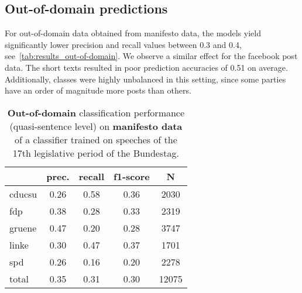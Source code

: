 \documentclass[11pt]{article}
\begin{document}
\subsection{Out-of-domain predictions}
For out-of-domain data obtained from manifesto data, the models yield significantly lower precision and recall values between 0.3 and 0.4, see~\autoref{tab:results_out-of-domain}. We observe a similar effect for the facebook post data. The short texts resulted in poor prediction accuracies of 0.51 on average. Additionally, classes were highly unbalanced in this setting, since some parties have an order of magnitude more posts than others.


\begin{table}[t]
\caption{
\label{tab:results_out-of-domain}
{\bf Out-of-domain} classification performance (quasi-sentence level) on {\bf manifesto data} of a classifier trained on speeches of the 17th legislative period of the Bundestag.
}

\begin{center}
\begin{tabular}{lcccc}
    &         prec.    &recall &  f1-score  & N  \\
\hline \hline
    cducsu    &   0.26   &   0.58   &   0.36    &   2030 \\
    fdp    &   0.38   &   0.28   &   0.33    &   2319 \\
     gruene   &    0.47    &  0.20   &   0.28    &  3747\\
      linke     &  0.30  &    0.47    &  0.37    &   1701\\
        spd     &  0.26  &    0.16   &   0.20    &   2278\\
\hline
total    &   0.35  &    0.31  &    0.30   &   12075\\
%
\end{tabular}
\end{center}

\end{table}
\end{document}
